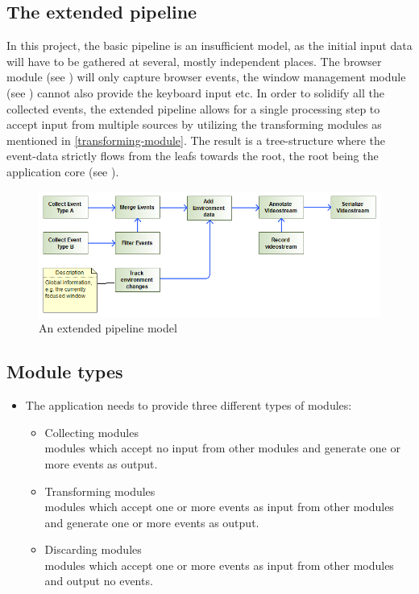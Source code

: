 \subsection{The extended pipeline}
\label{sec:sm_extpipe}
In this project, the basic pipeline is an insufficient model, as the initial input data will have to be gathered at several, mostly independent places. The \gls{browser} module (see ) will only capture \gls{browser} \glspl{event}, the window management \gls{module} (see ) cannot also provide the keyboard input etc. In order to solidify all the collected \glspl{event}, the extended pipeline allows for a single processing step to accept input from multiple sources by utilizing the transforming modules as mentioned in \ref{transforming-module}. The result is a tree-structure where the \gls{event}-data strictly flows from the leafs towards the root, the root being the application core (see ).
\begin{figure}[h!]
  \includegraphics[width=1.00\textwidth]{resources/extendedpipeline.png}
  \centering
  \caption{An extended pipeline model}
  \label{fig:sm_extpipe}
\end{figure}

\subsection{Module types}
\label{sec:module-types}

\begin{itemize}
    \item{The application needs to provide three different types of \glspl{module}:
    \begin{itemize}
        \item Collecting \glspl{module}\label{collecting-module}\\\Glspl{module} which accept no input from other \glspl{module} and generate one or more \glspl{event} as output.
        \item Transforming \glspl{module}\label{transforming-module}\\\Glspl{module} which accept one or more \glspl{event} as input from other \glspl{module} and generate one or more \glspl{event} as output.
        \item Discarding \glspl{module}\label{discarding-module}\\\Glspl{module} which accept one or more \glspl{event} as input from other \glspl{module} and output no \glspl{event}.
    \end{itemize}}
\end{itemize}


